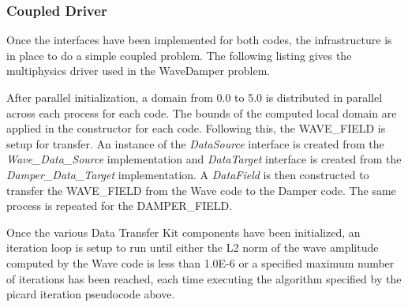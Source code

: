 \documentclass[letterpaper]{article}
\begin{document}
\subsubsection{Coupled Driver}
Once the interfaces have been implemented for both codes, the
infrastructure is in place to do a simple coupled problem. The
following listing gives the multiphysics driver used in the WaveDamper
problem.

After parallel initialization, a domain from 0.0 to 5.0 is distributed
in parallel across each process for each code. The bounds of the
computed local domain are applied in the constructor for each
code. Following this, the WAVE\_FIELD is setup for transfer. An
instance of the {\sl DataSource} interface is created from the {\sl
  Wave\_Data\_Source} implementation and {\sl DataTarget} interface
is created from the {\sl Damper\_Data\_Target} implementation. A {\sl
  DataField} is then constructed to transfer the WAVE\_FIELD from
the Wave code to the Damper code. The same process is repeated for the
DAMPER\_FIELD. 

Once the various Data Transfer Kit components have been initialized, an
iteration loop is setup to run until either the L2 norm of the wave
amplitude computed by the Wave code is less than 1.0E-6 or a specified
maximum number of iterations has been reached, each time executing the
algorithm specified by the picard iteration pseudocode above.
\end{document}
